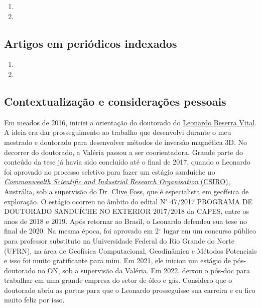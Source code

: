 \begin{enumerate}
	\item {}
	\item {}
\end{enumerate}


\subsection*{Artigos em periódicos indexados}

\begin{enumerate}
	\item {}
	\item {}
\end{enumerate}


\subsection*{Contextualização e considerações pessoais}

Em meados de 2016, iniciei a orientação do doutorado do 
\href{https://lattes.cnpq.br/3155435296388448}{Leonardo Beserra Vital}.
A ideia era dar prosseguimento ao trabalho que desenvolvi durante o meu mestrado e 
doutorado para desenvolver métodos de inversão magnética 3D.
No decorrer do doutorado, a Valéria passou a ser coorientadora.
Grande parte do conteúdo da tese já havia sido concluído até o final de 2017, quando
o Leonardo foi aprovado no processo seletivo para fazer um estágio sanduíche no 
\href{https://www.csiro.au/}{\textit{Commonwealth Scientific and Industrial Research Organisation} (CSIRO)}, Austrália, sob a supervisão do Dr.
\href{https://confluence.csiro.au/display/cmfr/CSIRO+Remanent+Magnetists}{Clive Foss}, 
que é especialista em geofísica de exploração. O estágio ocorreu no âmbito do edital
N$^{\circ}$ 47/2017 PROGRAMA DE DOUTORADO SANDUÍCHE NO EXTERIOR 2017/2018 da CAPES, 
entre os anos de 2018 e 2019. Após retornar ao Brasil, o Leonardo defendeu sua tese
no final de 2020. Na mesma época, foi aprovado em 2$^{\circ}$ lugar em um concurso 
público para
professor substituto na Universidade Federal do Rio Grande do Norte (UFRN), na área de
Geofísica Computacional, Geodinâmica e Métodos Potenciais e isso foi muito gratificante
para mim. Em 2021, ele iniciou um estágio de pós-doutorado no ON, sob a supervisão da
Valéria. Em 2022, deixou o pós-doc para trabalhar em uma grande empresa do setor de óleo e gás.
Considero que o doutorado abriu as portas para que o Leonardo prosseguisse sua 
carreira e eu fico muito feliz por isso.

